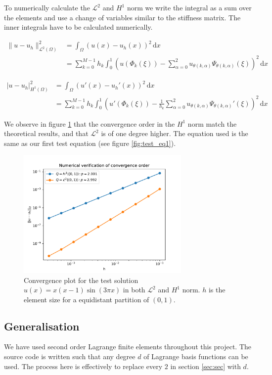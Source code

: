 To numerically calculate the \( \mathcal{L}^2 \) and \( H^1 \) norm
we write the integral as a sum over the elements
and use a change of variables similar to the stiffness matrix.
The inner integrals have to be calculated numerically.

\begin{align}
  \lVert u - u_h \rVert_{\mathcal{L}^2(\Omega)}^2 
    &= \int_{\Omega}(u(x) - u_h(x))^2 \,\mathrm{d}x \\
    &= \sum_{k=0}^{M-1} h_k \int_{0}^{1}
    \left(
    u(\Phi_k(\xi)) 
      - \sum_{\alpha=0}^{2} u_{\theta(k, \alpha)} \Psi_{\theta(k, \alpha)}(\xi)
    \right)^2 \,\mathrm{d}x
\end{align}

\begin{align}
  \lvert u - u_h \rvert_{H^1(\Omega)}^2 
    &= \int_{\Omega}(u'(x) - u_h'(x))^2 \,\mathrm{d}x \\
    &= \sum_{k=0}^{M-1} h_k \int_{0}^{1}
    \left(
    u'(\Phi_k(\xi)) 
      - \frac{1}{h_k} \sum_{\alpha=0}^{2} u_{\theta(k, \alpha)} \Psi_{\theta(k, \alpha)}'(\xi)
    \right)^2 \,\mathrm{d}x
\end{align}

We observe in figure \ref{fig:conv_plot} that the convergence order
in the $H^1$ norm match the theoretical results, and that $\mathcal{L}^2$ is of one degree higher. The equation used is the same as our
first test equation (see figure \ref{fig:test_eq1}).

\begin{figure}
  \centering
  \includegraphics[width=0.75\textwidth]{Images/plots/task1_conv_plot.pdf}
  \caption{Convergence plot for the test solution
  \( u(x) = x(x-1)\sin(3\pi x) \) in both
  \( \mathcal{L}^2 \) and \( H^1 \) norm.
\( h \) is the element size for a equidistant partition of \( (0, 1) \).}
  \label{fig:conv_plot}
\end{figure}

\subsection{Generalisation}

We have used second order Lagrange finite elements
throughout this project. The source code is written
such that any degree \( d \) of Lagrange basis functions can be used.
The process here is effectively to replace every 
\( 2 \) in section \ref{sec:sec} with \( d \).

